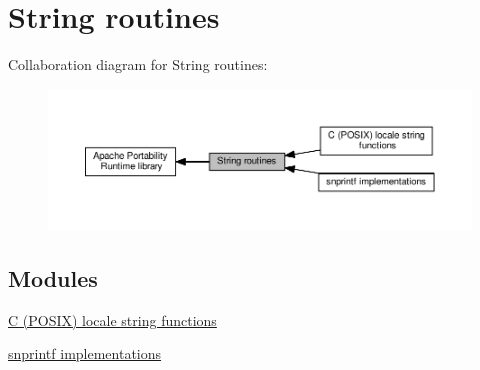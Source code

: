 \hypertarget{group__apr__strings}{}\section{String routines}
\label{group__apr__strings}
Collaboration diagram for String routines\+:
\nopagebreak
\begin{figure}[H]
\begin{center}
\leavevmode
\includegraphics[width=350pt]{group__apr__strings}
\end{center}
\end{figure}
\subsection*{Modules}
\begin{DoxyCompactItemize}
\item 
\hyperlink{group__apr__cstr}{C (\+P\+O\+S\+I\+X) locale string functions}
\item 
\hyperlink{group__APR__Strings__Snprintf}{snprintf implementations}
\end{DoxyCompactItemize}
